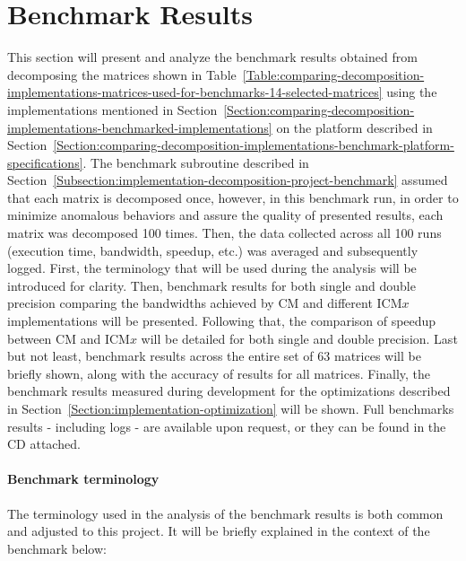 \section{Benchmark Results \TO}\label{Section:comparing-decomposition-implementations-benchmark-results}
This section will present and analyze the benchmark results obtained from decomposing the matrices shown in Table~\ref{Table:comparing-decomposition-implementations-matrices-used-for-benchmarks-14-selected-matrices} using the implementations mentioned in Section~\ref{Section:comparing-decomposition-implementations-benchmarked-implementations} on the platform described in Section~\ref{Section:comparing-decomposition-implementations-benchmark-platform-specifications}. The benchmark subroutine described in Section~\ref{Subsection:implementation-decomposition-project-benchmark} assumed that each matrix is decomposed once, however, in this benchmark run, in order to minimize anomalous behaviors and assure the quality of presented results, each matrix was decomposed 100 times. Then, the data collected across all 100 runs (execution time, bandwidth, speedup, etc.) was averaged and subsequently logged. First, the terminology that will be used during the analysis will be introduced for clarity. Then, benchmark results for both single and double precision comparing the bandwidths achieved by CM and different ICM$ x $ implementations will be presented. Following that, the comparison of speedup between CM and ICM$ x $ will be detailed for both single and double precision. Last but not least, benchmark results across the entire set of 63 matrices will be briefly shown, along with the accuracy of results for all matrices. Finally, the benchmark results measured during development for the optimizations described in Section~\ref{Section:implementation-optimization} will be shown. Full benchmarks results - including logs - are available upon request, or they can be found in the CD attached.

\paragraph{Benchmark terminology} The terminology used in the analysis of the benchmark results is both common and adjusted to this project. It will be briefly explained in the context of the benchmark below:

